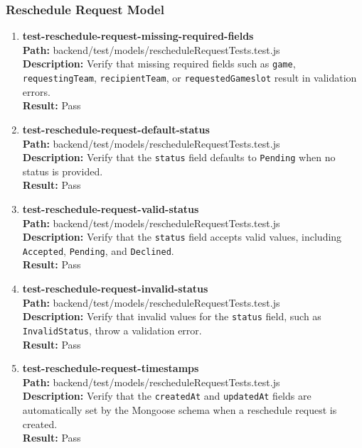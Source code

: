 \documentclass[12pt, titlepage]{article}
\begin{document}
\subsubsection{Reschedule Request Model}
    \begin{enumerate}\item{\textbf{test-reschedule-request-missing-required-fields}\\}
        \textbf{Path:} backend/test/models/rescheduleRequestTests.test.js\\
        \textbf{Description:} Verify that missing required fields such as \texttt{game}, \texttt{requestingTeam}, \texttt{recipientTeam}, or \texttt{requestedGameslot} result in validation errors.\\
        \textbf{Result:} Pass

    \item{\textbf{test-reschedule-request-default-status}\\}
        \textbf{Path:} backend/test/models/rescheduleRequestTests.test.js\\
        \textbf{Description:} Verify that the \texttt{status} field defaults to \texttt{Pending} when no status is provided.\\
        \textbf{Result:} Pass

    \item{\textbf{test-reschedule-request-valid-status}\\}
        \textbf{Path:} backend/test/models/rescheduleRequestTests.test.js\\
        \textbf{Description:} Verify that the \texttt{status} field accepts valid values, including \texttt{Accepted}, \texttt{Pending}, and \texttt{Declined}.\\
        \textbf{Result:} Pass

    \item{\textbf{test-reschedule-request-invalid-status}\\}
        \textbf{Path:} backend/test/models/rescheduleRequestTests.test.js\\
        \textbf{Description:} Verify that invalid values for the \texttt{status} field, such as \texttt{InvalidStatus}, throw a validation error.\\
        \textbf{Result:} Pass

    \item{\textbf{test-reschedule-request-timestamps}\\}
        \textbf{Path:} backend/test/models/rescheduleRequestTests.test.js\\
        \textbf{Description:} Verify that the \texttt{createdAt} and \texttt{updatedAt} fields are automatically set by the Mongoose schema when a reschedule request is created.\\
        \textbf{Result:} Pass
\end{enumerate}
\end{document}
